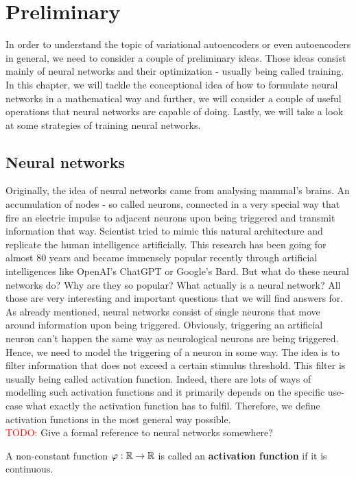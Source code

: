 \chapter{Preliminary}\label{preliminary}
In order to understand the topic of variational autoencoders or even autoencoders in general, we need to consider a couple of preliminary ideas. Those ideas consist mainly of neural networks and their optimization - usually being called training. In this chapter, we will tackle the conceptional idea of how to formulate neural networks in a mathematical way and further, we will consider a couple of useful operations that neural networks are capable of doing. Lastly, we will take a look at some strategies of training neural networks.

\section{Neural networks}
Originally, the idea of neural networks came from analysing mammal's brains. An accumulation of nodes - so called neurons, connected in a very special way that fire an electric impulse to adjacent neurons upon being triggered and transmit information that way. Scientist tried to mimic this natural architecture and replicate the human intelligence artificially. This research has been going for almost 80 years and became immensely popular recently through artificial intelligences like OpenAI's ChatGPT or Google's Bard. But what do these neural networks do? Why are they so popular? What actually is a neural network? All those are very interesting and important questions that we will find answers for.\\
As already mentioned, neural networks consist of single neurons that move around information upon being \glqq triggered\grqq{}. Obviously, triggering an artificial neuron can't happen the same way as neurological neurons are being triggered. Hence, we need to model the triggering of a neuron in some way. The idea is to filter information that does not exceed a certain stimulus threshold. This filter is usually being called activation function. Indeed, there are lots of ways of modelling such activation functions and it primarily depends on the specific use-case what exactly the activation function has to fulfil. Therefore, we define activation functions in the most general way possible.\\
\textcolor{red}{TODO:} Give a formal reference to neural networks somewhere?

\begin{definition}
A non-constant function $\operatorname{\varphi}: \operatorname{\mathbb{R}} \to \operatorname{\mathbb{R}}$ is called an \textbf{activation function} if it is continuous.
\end{definition}


